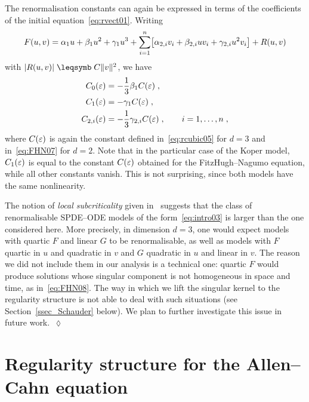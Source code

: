 \documentclass[reqno,11pt]{article}
\begin{document}
The renormalisation constants can again be expressed in terms of the
coefficients of the initial equation~\eqref{eq:rvect01}. Writing 
\begin{equation}
 \label{eq:rvect04}
 F(u,v) = \alpha_1 u + \beta_1 u^2 + \gamma_1 u^3 
 + \sum_{i=1}^n \bigbrak{\alpha_{2,i}v_i + \beta_{2,i}uv_i +
\gamma_{2,i}u^2v_i} + R(u,v)
\end{equation} 
with $\abs{R(u,v)} \leqs C\norm{v}^2$, we have 
\begin{align}
\nonumber
C_0(\eps) &= -\frac13 \beta_1 C(\eps)\;, \\
\label{eq:rvect05} 
C_1(\eps) &= -\gamma_1 C(\eps)\;, \\
C_{2,i}(\eps) &= -\frac13 \gamma_{2,i} C(\eps)\;,
\qquad i=1,\dots, n\;, 
\nonumber
\end{align}
where $C(\varepsilon)$ is again the constant defined in~\eqref{eq:rcubic05} for $d=3$
and in~\eqref{eq:FHN07} for $d=2$. Note that in the particular case of the Koper
model, $C_1(\varepsilon)$ is equal to the constant $C(\varepsilon)$ obtained for the
FitzHugh--Nagumo equation, while all other constants vanish. This is not
surprising, since both models have the same nonlinearity. 

\begin{remark}
\label{rem:subcritical}
The notion of \emph{local subcriticality} given
in~\cite[Assumption~8.3]{Hairer2014} suggests that the class of renormalisable
SPDE--ODE models of the form~\eqref{eq:intro03} is larger than the one
considered here. More precisely, in dimension $d=3$, one would expect models
with quartic $F$ and linear $G$ to be renormalisable, as well as models with
$F$ quartic in $u$ and quadratic in $v$ and $G$ quadratic in $u$ and linear in
$v$. The reason we did not include them in our analysis
is a technical one: quartic $F$ would produce solutions whose singular component
is not homogeneous in space and time, as in~\eqref{eq:FHN08}. The way in which
we lift the singular kernel to the regularity structure is not able to deal with
such situations  (see Section~\ref{ssec_Schauder} below). We plan to further
investigate this issue in future work.~$\lozenge$
\end{remark}






\section{Regularity structure for the Allen--Cahn equation}
\label{sec_rs}
\end{document}
